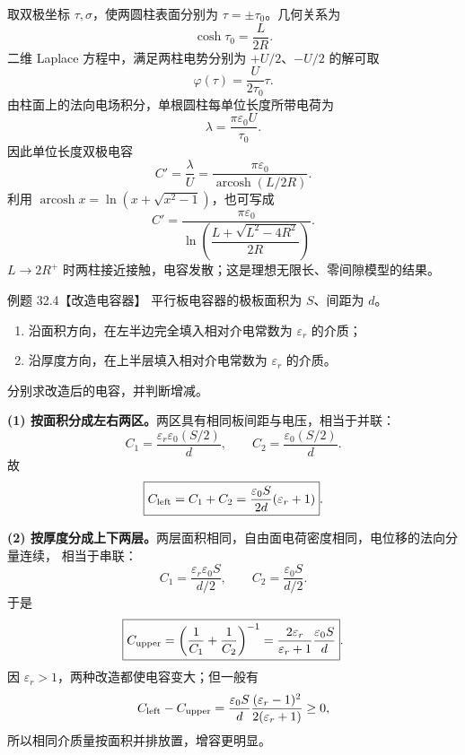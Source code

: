\begin{xesolution}
取双极坐标 $\tau,\sigma$，使两圆柱表面分别为 $\tau=\pm\tau_0$。几何关系为
\begin{equation}
  \boxed{\cosh\tau_0=\frac{L}{2R}}.
\end{equation}
二维 Laplace 方程中，满足两柱电势分别为 $+U/2$、$-U/2$ 的解可取
\[
  \varphi(\tau)=\frac{U}{2\tau_0}\tau.
\]
由柱面上的法向电场积分，单根圆柱每单位长度所带电荷为
\[
  \lambda=\frac{\pi\varepsilon_0U}{\tau_0}.
\]
因此单位长度双极电容
\begin{equation}
  \boxed{C'=\frac\lambda U
  =\frac{\pi\varepsilon_0}{\operatorname{arcosh}(L/2R)}}.
\end{equation}
利用 $\operatorname{arcosh}x=\ln(x+\sqrt{x^2-1})$，也可写成
\begin{equation}
  \boxed{C'=\frac{\pi\varepsilon_0}
  {\ln\!\left(\dfrac{L+\sqrt{L^2-4R^2}}{2R}\right)}}.
\end{equation}
$L\to2R^+$ 时两柱接近接触，电容发散；这是理想无限长、零间隙模型的结果。

\twoCylinderDiagram
\end{xesolution}

\Needspace{0.4\textheight}
\begin{origexamplebox}{例题 32.4【改造电容器】}
平行板电容器的极板面积为 $S$、间距为 $d$。
\begin{enumerate}[label=(\arabic*),leftmargin=2.2em]
  \item 沿面积方向，在左半边完全填入相对介电常数为 $\varepsilon_r$ 的介质；
  \item 沿厚度方向，在上半层填入相对介电常数为 $\varepsilon_r$ 的介质。
\end{enumerate}
分别求改造后的电容，并判断增减。
\end{origexamplebox}

\begin{xesolution}
\textbf{(1) 按面积分成左右两区。}两区具有相同板间距与电压，相当于并联：
\[
  C_1=\frac{\varepsilon_r\varepsilon_0(S/2)}d,
  \qquad C_2=\frac{\varepsilon_0(S/2)}d.
\]
故
\begin{equation}
  \boxed{C_{\rm left}=C_1+C_2
  =\frac{\varepsilon_0S}{2d}(\varepsilon_r+1)}.
\end{equation}

\textbf{(2) 按厚度分成上下两层。}两层面积相同，自由面电荷密度相同，电位移的法向分量连续，
相当于串联：
\[
  C_1=\frac{\varepsilon_r\varepsilon_0S}{d/2},
  \qquad C_2=\frac{\varepsilon_0S}{d/2}.
\]
于是
\begin{equation}
  \boxed{C_{\rm upper}=\left(\frac1{C_1}+\frac1{C_2}\right)^{-1}
  =\frac{2\varepsilon_r}{\varepsilon_r+1}\frac{\varepsilon_0S}{d}}.
\end{equation}
因 $\varepsilon_r>1$，两种改造都使电容变大；但一般有
\[
  C_{\rm left}-C_{\rm upper}
  =\frac{\varepsilon_0S}{d}\frac{(\varepsilon_r-1)^2}{2(\varepsilon_r+1)}\ge0,
\]
所以相同介质量按面积并排放置，增容更明显。

\splitDielectricDiagram
\end{xesolution}

